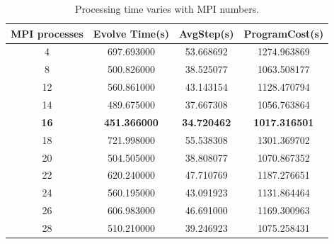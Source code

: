 \begin{table}[!htbp]
    \centering
    \caption{Processing time varies with MPI numbers.}
    \label{tab:mpi nums}
    \begin{tabular}{|c|c|c|c|}
        \hline
         \textbf{MPI processes} & \textbf{Evolve Time(s)}         &  \textbf{AvgStep(s)}           & \textbf{ProgramCost(s)}  \\
         \hline
         4             & 697.693000          & 53.668692          & 1274.963869          \\
         \hline
         8             & 500.826000          & 38.525077          & 1063.508177          \\
         \hline
         12            & 560.861000          & 43.143154          & 1128.470794          \\
         \hline
         14            & 489.675000          & 37.667308          & 1056.763864          \\
         \hline
         \textbf{16}   & \textbf{451.366000} & \textbf{34.720462} & \textbf{1017.316501} \\
         \hline
         18            & 721.998000          & 55.538308          & 1301.369702          \\
         \hline
         20            & 504.505000          & 38.808077          & 1070.867352          \\
         \hline
         22            & 620.240000          & 47.710769          & 1187.276651          \\
         \hline
         24            & 560.195000          & 43.091923          & 1131.864464          \\
         \hline
         26            & 606.983000          & 46.691000          & 1169.300963          \\
         \hline
         28            & 510.210000          & 39.246923          & 1075.258431          \\
         \hline
    \end{tabular}
\end{table}
